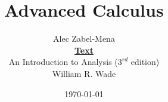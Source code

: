 \documentclass[12pt, twoside]{book}
\title{Advanced Calculus}
\author{Alec Zabel-Mena\\ \textbf{\underline{Text}} \\An Introduction to Analysis ($3^{rd}$ edition) \\ William R. Wade}
\date{\today}
\theoremstyle{plain}
\theoremstyle{plain} %
\theoremstyle{definition}
\theoremstyle{remark}
\begin{document}
\maketitle







\nocite{*}



\end{document}
